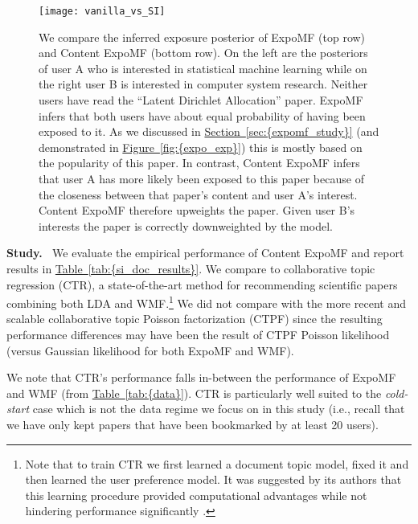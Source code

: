 \documentclass{sig-alternate-arxiv}
\begin{document}
\begin{figure*}
  \centering
    \texttt{[image: vanilla\_vs\_SI]}
    \caption{We compare the inferred exposure posterior of ExpoMF (top row)
    and Content ExpoMF (bottom row). On the left are the posteriors of user A
    who is interested in statistical machine learning while on the right
    user B is interested in computer system research. Neither users have
    read the ``Latent Dirichlet Allocation'' paper. ExpoMF
    infers that both users have about equal probability of having been
    exposed to it. As we discussed in {\hyperref[sec:{expomf_study}]{Section~\ref*{sec:{expomf_study}}}} (and demonstrated in {\hyperref[fig:{expo_exp}]{Figure~\ref*{fig:{expo_exp}}}}) this is mostly based on the
    popularity of this paper. In contrast, Content ExpoMF infers that
    user A has more likely been exposed to this paper because of the closeness
    between that paper's content and user A's interest. Content ExpoMF
    therefore upweights the paper. Given user B's interests the paper is
    correctly downweighted by the model.}
    \label{fig:si}
\end{figure*}

{\vspace{0.1in}\noindent \textbf{{Study.} \,}} We evaluate the empirical performance of Content ExpoMF and report results
in {\hyperref[tab:{si_doc_results}]{Table~\ref*{tab:{si_doc_results}}}}. We compare to collaborative topic
regression (CTR), a state-of-the-art method for recommending scientific
papers \cite{wang2011collaborative} combining both LDA and WMF.\footnote{Note that to train CTR
we first learned a document topic model, fixed it and then learned the
user preference model. It was suggested by its authors
that this learning procedure provided computational advantages while not hindering performance significantly \citep{wang2011collaborative}.}
We did not compare with the more recent and scalable collaborative topic
Poisson factorization (CTPF) \cite{gopalan2014content} since the resulting
performance differences may have been the result of CTPF Poisson
likelihood (versus Gaussian likelihood for both ExpoMF and WMF).

We note that CTR's performance falls in-between the performance of ExpoMF
and WMF (from {\hyperref[tab:{data}]{Table~\ref*{tab:{data}}}}). CTR is particularly well suited to the
\emph{cold-start} case which is not the data regime we focus on in this
study (i.e., recall that we have only kept papers that have been
bookmarked by at least 20 users).
\end{document}
